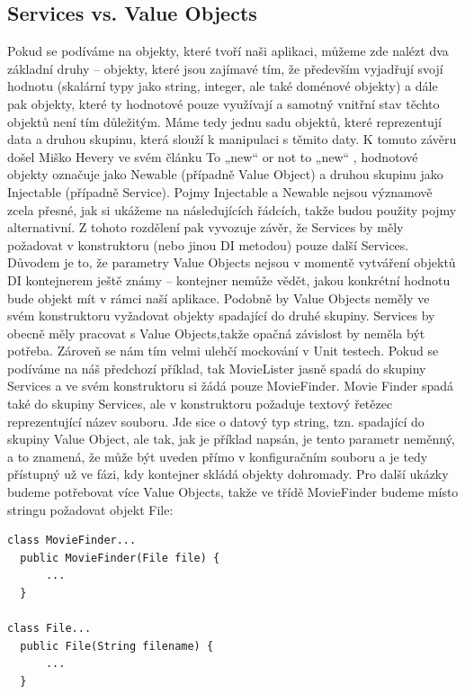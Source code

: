 \documentclass[a4paper,conference]{IEEEtran}
\begin{document}
\subsection{Services vs. Value Objects}

Pokud se podíváme na objekty, které tvoří naši aplikaci, můžeme zde nalézt dva základní druhy – objekty, které jsou zajímavé tím, že především vyjadřují svojí hodnotu (skalární typy jako string, integer, ale také doménové objekty) a dále pak objekty, které ty hodnotové pouze využívají a samotný vnitřní stav těchto objektů není tím důležitým. Máme tedy jednu sadu objektů, které reprezentují data a druhou skupinu, která slouží k manipulaci s těmito daty. K tomuto závěru došel Miško Hevery ve svém článku To „new“ or not to „new“ \cite{How to Think About the new Operator with Respect to Unit Testing}, hodnotové objekty označuje jako Newable (případně Value Object) a druhou skupinu jako Injectable (případně Service). Pojmy Injectable a Newable nejsou významově zcela přesné, jak si ukážeme na následujících řádcích, takže budou použity pojmy alternativní. Z tohoto rozdělení pak vyvozuje závěr, že Services by měly požadovat v konstruktoru (nebo jinou DI metodou) pouze další Services. Důvodem je to, že parametry Value Objects nejsou v momentě vytváření objektů DI kontejnerem ještě známy – kontejner nemůže vědět, jakou konkrétní hodnotu bude objekt mít v rámci naší aplikace. Podobně by Value Objects neměly ve svém konstruktoru vyžadovat objekty spadající do druhé skupiny. Services by obecně měly pracovat s Value Objects,takže opačná závislost by neměla být potřeba. Zároveň se nám tím velmi ulehčí mockování v Unit testech.
Pokud se podíváme na náš předchozí příklad, tak MovieLister jasně spadá do skupiny Services a ve svém konstruktoru si žádá pouze MovieFinder. Movie Finder spadá také do skupiny Services, ale v konstruktoru požaduje textový řetězec reprezentující název souboru. Jde sice o datový typ string, tzn. spadající do skupiny Value Object, ale tak, jak je příklad napsán, je tento parametr neměnný, a to znamená, že může být uveden přímo v konfiguračním souboru a je tedy přístupný už ve fázi, kdy kontejner skládá objekty dohromady.
Pro další ukázky budeme potřebovat více Value Objects, takže ve třídě MovieFinder budeme místo stringu požadovat objekt File:

\lstset{language=Java, caption=Value Object jako parametr v konstruktoru, label=listing:Java}
\begin{lstlisting}
class MovieFinder...
  public MovieFinder(File file) {
      ...
  }

class File...
  public File(String filename) {
      ...
  }
\end{lstlisting}
\end{document}

